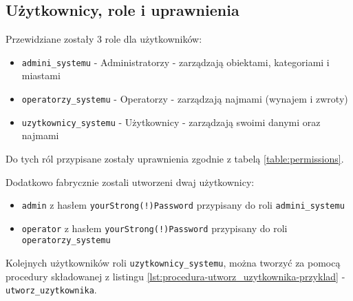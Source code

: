\subsection{Użytkownicy, role i uprawnienia}

Przewidziane zostały 3 role dla użytkowników:
\begin{itemize}
	\item \texttt{admini\_systemu} - Administratorzy - zarządzają obiektami, kategoriami i miastami
	\item \texttt{operatorzy\_systemu} - Operatorzy - zarządzają najmami (wynajem i zwroty)
	\item \texttt{uzytkownicy\_systemu} - Użytkownicy - zarządzają swoimi danymi oraz najmami
\end{itemize}
Do tych ról przypisane zostały uprawnienia zgodnie z tabelą \ref{table:permissions}.

Dodatkowo fabrycznie zostali utworzeni dwaj użytkownicy:
\begin{itemize}
	\item \texttt{admin} z hasłem \texttt{yourStrong(!)Password} przypisany do roli \texttt{admini\_systemu}
	\item \texttt{operator} z hasłem \texttt{yourStrong(!)Password} przypisany do roli \texttt{operatorzy\_systemu}
\end{itemize}

Kolejnych użytkowników roli \texttt{uzytkownicy\_systemu}, można tworzyć za pomocą procedury składowanej z listingu \ref{lst:procedura-utworz_uzytkownika-przyklad} - \texttt{utworz\_uzytkownika}.

